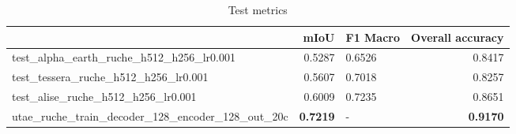 \begin{table}
\caption{Test metrics}
\label{tab:test_metrics}
\begin{tabular}{lrlr}
\toprule
 & mIoU & F1 Macro & Overall accuracy \\
\midrule
test\_alpha\_earth\_ruche\_h512\_h256\_lr0.001 & 0.5287 & 0.6526 & 0.8417 \\
test\_tessera\_ruche\_h512\_h256\_lr0.001 & 0.5607 & 0.7018 & 0.8257 \\
test\_alise\_ruche\_h512\_h256\_lr0.001 & 0.6009 & 0.7235 & 0.8651 \\
utae\_ruche\_train\_decoder\_128\_encoder\_128\_out\_20c & \textbf{0.7219} & - & \textbf{0.9170} \\
\bottomrule
\end{tabular}
\end{table}
